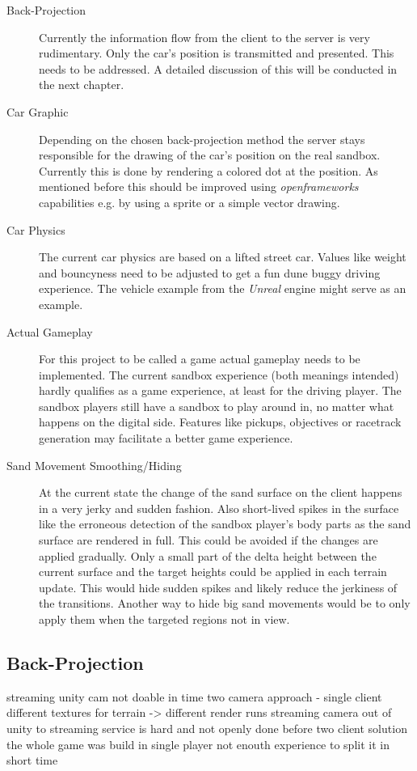 \documentclass[12pt,a4paper,twoside,titlepage,headsepline,numbers=noenddot,listof=totoc,index=totoc,bibliography=totoc]{scrartcl}
\theoremstyle{break}
\begin{document}
\begin{description}
	\item[Back-Projection] Currently the information flow from the client to the server is very rudimentary. Only the car's position is transmitted and presented. This needs to be addressed. A detailed discussion of this will be conducted in the next chapter. 
	
	\item[Car Graphic] Depending on the chosen back-projection method the server stays responsible for the drawing of the car's position on the real sandbox. Currently this is done by rendering a colored dot  at the position. As mentioned before this should be improved using \textit{openframeworks} capabilities e.g. by using a sprite or a simple vector drawing.
	
	\item[Car Physics] The current car physics are based on a lifted street car. Values like weight and bouncyness need to be adjusted to get a fun dune buggy driving experience. The vehicle example from the \textit{Unreal} engine might serve as an example.
	
	\item[Actual Gameplay] For this project to be called a game actual gameplay needs to be implemented. The current sandbox experience (both meanings intended) hardly qualifies as a game experience, at least for the driving player. The sandbox players still have a sandbox to play around in, no matter what happens on the digital side. Features like pickups, objectives or racetrack generation may facilitate a better game experience.
	
	\item[Sand Movement Smoothing/Hiding] At the current state the change of the sand surface on the client happens in a very jerky and sudden fashion. Also short-lived spikes in the surface like the erroneous detection of the sandbox player's body parts as the sand surface are rendered in full. This could be avoided if the changes are applied gradually. Only a small part of the delta height between the current surface and the target heights could be applied in each terrain update. This would hide sudden spikes and likely reduce the jerkiness of the transitions. Another way to hide big sand movements would be to only apply them when the targeted regions not in view. 
\end{description}

\subsection{Back-Projection}
\label{ch:backProjection}
streaming unity cam not doable in time
two camera approach - single client
different textures for terrain -> different render runs
streaming camera out of unity to streaming service is hard and not openly done before
two client solution
the whole game was build in single player
not enouth experience to split it in short time
\end{document}
